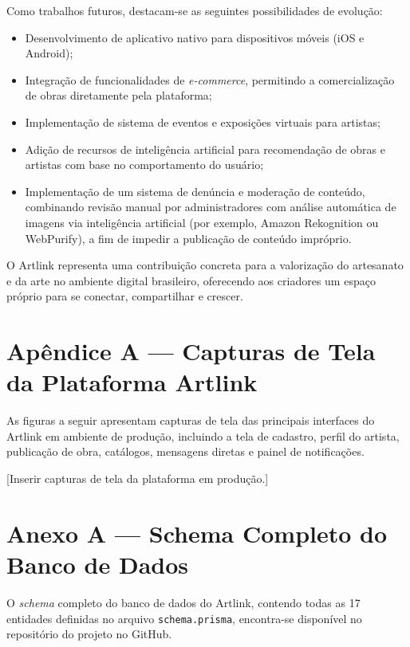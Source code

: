 \documentclass[a4paper, 12pt, oneside]{article}
\begin{document}
Como trabalhos futuros, destacam-se as seguintes possibilidades de evolução:

\begin{itemize}
    \item Desenvolvimento de aplicativo nativo para dispositivos móveis (iOS e Android);
    \item Integração de funcionalidades de \textit{e-commerce}, permitindo a comercialização de obras diretamente pela plataforma;
    \item Implementação de sistema de eventos e exposições virtuais para artistas;
    \item Adição de recursos de inteligência artificial para recomendação de obras e artistas com base no comportamento do usuário;
    \item Implementação de um sistema de denúncia e moderação de conteúdo, combinando revisão manual por administradores com análise automática de imagens via inteligência artificial (por exemplo, Amazon Rekognition ou WebPurify), a fim de impedir a publicação de conteúdo impróprio.
\end{itemize}

O Artlink representa uma contribuição concreta para a valorização do artesanato e da arte no ambiente digital brasileiro, oferecendo aos criadores um espaço próprio para se conectar, compartilhar e crescer.




\clearpage
\section*{Apêndice A --- Capturas de Tela da Plataforma Artlink}

As figuras a seguir apresentam capturas de tela das principais interfaces do Artlink em ambiente de produção, incluindo a tela de cadastro, perfil do artista, publicação de obra, catálogos, mensagens diretas e painel de notificações.

[Inserir capturas de tela da plataforma em produção.]


\clearpage
\section*{Anexo A --- Schema Completo do Banco de Dados}

O \textit{schema} completo do banco de dados do Artlink, contendo todas as 17 entidades definidas no arquivo \texttt{schema.prisma}, encontra-se disponível no repositório do projeto no GitHub.
\end{document}
